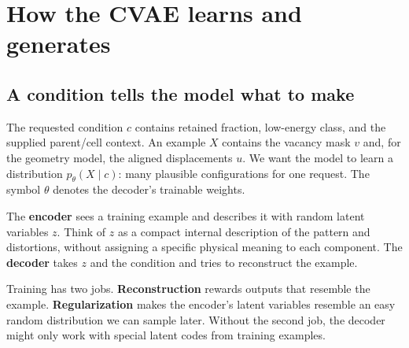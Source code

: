\clearpage
\section{How the CVAE learns and generates}\label{sec:cvae}

\subsection*{A condition tells the model what to make}
The requested condition $c$ contains retained fraction, low-energy class, and the supplied parent/cell context. An example $X$ contains the vacancy mask $v$ and, for the geometry model, the aligned displacements $u$. We want the model to learn a distribution $p_\theta(X\mid c)$: many plausible configurations for one request. The symbol $\theta$ denotes the decoder's trainable weights.

The \textbf{encoder} sees a training example and describes it with random latent variables $z$. Think of $z$ as a compact internal description of the pattern and distortions, without assigning a specific physical meaning to each component. The \textbf{decoder} takes $z$ and the condition and tries to reconstruct the example.

\begin{center}
\end{center}

Training has two jobs. \textbf{Reconstruction} rewards outputs that resemble the example. \textbf{Regularization} makes the encoder's latent variables resemble an easy random distribution we can sample later. Without the second job, the decoder might only work with special latent codes from training examples.

